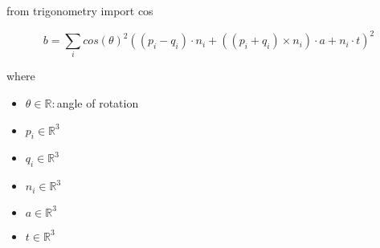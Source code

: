\documentclass[12pt]{article}
\begin{document}
from trigonometry import cos

\[
\textit{b} = \sum_\textit{i} cos(\textit{θ})^{2}((\textit{p}_{ \textit{i} } - \textit{q}_{ \textit{i} }) \cdot \textit{n}_{ \textit{i} } + ((\textit{p}_{ \textit{i} } + \textit{q}_{ \textit{i} }) × \textit{n}_{ \textit{i} }) \cdot \textit{a} + \textit{n}_{ \textit{i} } \cdot \textit{t})^{2}
\]

where
\begin{itemize}
\item $\textit{θ} \in \mathbb{{R}}:$angle of rotation
\item $\textit{p}_{\textit{i}} \in \mathbb{R}^{ 3}$
\item $\textit{q}_{\textit{i}} \in \mathbb{R}^{ 3}$
\item $\textit{n}_{\textit{i}} \in \mathbb{R}^{ 3}$
\item $\textit{a} \in \mathbb{R}^{ 3}$
\item $\textit{t} \in \mathbb{R}^{ 3}$
\end{itemize}
\end{document}
